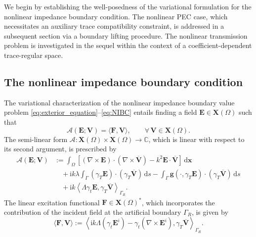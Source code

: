 \documentclass[10pt,a4paper]{amsart}
\numberwithin{equation}{section}
\begin{document}
We begin by establishing the well-posedness of the variational formulation for the nonlinear impedance boundary condition. The nonlinear PEC case, which necessitates an auxiliary trace compatibility constraint, is addressed in a subsequent section via a boundary lifting procedure. The nonlinear transmission problem is investigated in the sequel within the context of a coefficient-dependent trace-regular space.

\subsection{The nonlinear impedance boundary condition}

The variational characterization of the nonlinear impedance boundary value problem \eqref{eq:exterior_equation}--\eqref{eq:NIBC} entails finding a field $\mathbf{E} \in \mathbf{X}(\Omega)$ such that
\begin{equation}
\label{eq:main_formulation}
\mathcal{A}(\mathbf{E}; \mathbf{V}) = \langle \mathbf{F}, \mathbf{V} \rangle, \qquad \forall \, \mathbf{V} \in \mathbf{X}(\Omega).
\end{equation}
The semi-linear form $\mathcal{A} \colon \mathbf{X}(\Omega) \times \mathbf{X}(\Omega) \to \mathbb{C}$, which is linear with respect to its second argument, is prescribed by
\begin{equation}
\label{sef}
\begin{aligned}
\mathcal{A}(\mathbf{E}; \mathbf{V}) 
&:= \int_\Omega \left[ (\nabla \times \mathbf{E}) \cdot (\nabla \times \overline{\mathbf{V}}) - k^2 \mathbf{E} \cdot \overline{\mathbf{V}} \right] \, \mathrm{d}\boldsymbol {x} \\
&\quad + \mathrm{i}k\lambda \int_\Gamma (\gamma_T \mathbf{E}) \cdot (\gamma_T \overline{\mathbf{V}}) \, \mathrm{d}s - \int_\Gamma \mathbf{g}(\cdot, \gamma_T \mathbf{E}) \cdot (\gamma_T \overline{\mathbf{V}}) \, \mathrm{d}s \\
&\quad + \mathrm{i}k \left\langle \Lambda \gamma_t \mathbf{E}, \gamma_T \overline{\mathbf{V}} \right\rangle_{\Gamma_R}.
\end{aligned}
\end{equation}
The linear excitation functional $\mathbf{F} \in \mathbf{X}(\Omega)^*$, which incorporates the contribution of the incident field at the artificial boundary $\Gamma_R$, is given by
\begin{equation}
\label{eq:F_definition}
\langle \mathbf{F}, \mathbf{V} \rangle := \left\langle \mathrm{i}k \Lambda(\gamma_t \mathbf{E}^i) - \gamma_t (\nabla \times \mathbf{E}^i), \gamma_T \overline{\mathbf{V}} \right\rangle_{\Gamma_R}.
\end{equation}
\end{document}

